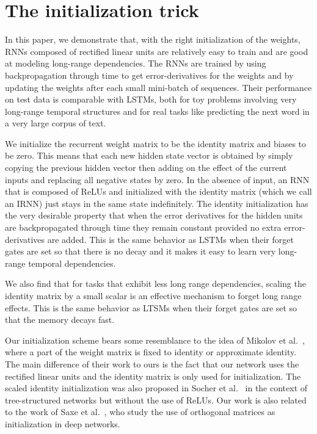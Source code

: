 \documentclass{article} \usepackage{nips14submit_e,times,graphicx}
\begin{document}
\section{The initialization trick}

In this paper, we demonstrate that, with the right initialization of
the weights, RNNs composed of rectified linear units are relatively
easy to train and are good at modeling long-range dependencies. The
RNNs are trained by using backpropagation through time to get
error-derivatives for the weights and by updating the weights after
each small mini-batch of sequences. Their performance on test data is
comparable with LSTMs, both for toy problems involving very long-range
temporal structures and for real tasks like predicting the next word in
a very large corpus of text.

We initialize the recurrent weight matrix to be the identity matrix
and biases to be zero. This means that each new hidden state vector is
obtained by simply copying the previous hidden vector then adding on
the effect of the current inputs and replacing all negative states by
zero. In the absence of input, an RNN that is composed of ReLUs and
initialized with the identity matrix (which we call an IRNN) just
stays in the same state indefinitely. The identity initialization has
the very desirable property that when the error derivatives for the
hidden units are backpropagated through time they remain constant
provided no extra error-derivatives are added.  This is the same
behavior as LSTMs when their forget gates are set  so
that there is no decay and it makes it easy to learn very long-range
temporal dependencies.

We also find that for tasks that exhibit less long range dependencies,
scaling the identity matrix by a small scalar is an effective
mechanism to forget long range effects. This is the same behavior as
LTSMs when their forget gates are set so that the memory decays fast.

Our initialization scheme bears some resemblance to the idea of
Mikolov et al.~\cite{mikolov2014learning}, where a part of the weight
matrix is fixed to identity or approximate identity. The main
difference of their work to ours is the fact that our network uses the
rectified linear units and the identity matrix is only used for
initialization. The scaled identity initialization was also proposed
in Socher et al.~\cite{socher13parsing} in the context of
tree-structured networks but without the use of ReLUs. Our work is
also related to the work of Saxe et al.~\cite{saxe2013exact}, who
study the use of orthogonal matrices as initialization in deep
networks.
\end{document}
